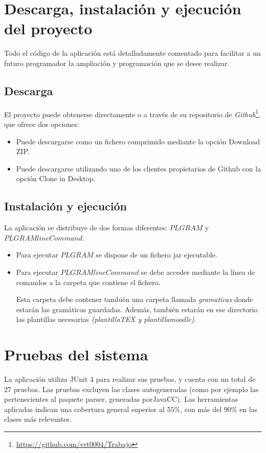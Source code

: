 \section{Descarga, instalación y ejecución del proyecto}
Todo el código de la aplicación está detalladamente comentado para facilitar a un futuro programador la ampliación y programación que se desee realizar.

\subsection{Descarga}
El proyecto puede obtenerse directamente o a través de su repositorio de \textit{Github}\footnote{\url {https://github.com/vrt0004/Trabajo}}, que ofrece dos opciones:

\begin{itemize}
\item Puede descargarse como un fichero comprimido mediante la opción Download  ZIP.
\item Puede descargarse utilizando  uno  de  los  clientes  propietarios  de  Github  con  la opción Clone  in  Desktop.
\end{itemize}

\subsection{Instalación y ejecución}
La aplicación se distribuye de dos formas diferentes: $PLGRAM$ y $PLGRAMlineCommand$.

\begin{itemize}
\item Para ejecutar $PLGRAM$ se dispone de un fichero jar ejecutable.
\item Para ejecutar $PLGRAMlineCommand$ se debe acceder mediante la línea de comandos a la carpeta que contiene el fichero.

Esta carpeta debe contener también una carpeta llamada \textit{gramaticas} donde estarán las gramáticas guardadas. Además, también estarán en ese directorio las plantillas necesarias \textit{(plantillaTEX y plantillamoodle)}.
\end{itemize}
\newpage
\section{Pruebas del sistema}

La aplicación utiliza JUnit 4 para realizar sus pruebas, y cuenta con un total de 27 pruebas. Las pruebas excluyen las clases autogeneradas (como por ejemplo las pertenecientes al paquete parser, generadas porJavaCC). Las herramientas aplicadas indican una cobertura general superior al $55\%$, con más del $90\%$ en las clases más relevantes.
\vspace{0.5cm}
\newpage
